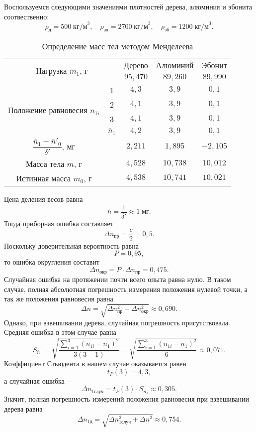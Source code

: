 Воспользуемся следующими значениями плотностей дерева, алюминия и эбонита соотвественно:
\[
\rho_\text{д}=500\;\text{кг/м}^3,\quad\rho_\text{ал}=2700\;\text{кг/м}^3,\quad\rho_\text{эб}=1200\;\text{кг/м}^3.
\]

\begin{table}[h]
	\begin{center}
	\begin{tabular}{|c|c|c|c|c|}
		\hline
		\multicolumn{2}{|c|}{\multirow{2}{*}{Нагрузка $m_1$, г}} & Дерево & Алюминий & Эбонит \\
		\cline{3-5}
		\multicolumn{2}{|c|}{} & $95{,}470$ & $89{,}260$ & $89{,}990$ \\
		\hline
		\hline
		\multirow{4}{*}{\parbox[c][4em]{9em}{Положение равновесия $n_{1i}$}} & 1 & $4{,}3$ & $3{,}9$ & $0{,}1$ \\
		\cline{2-5}
		& 2 & $4{,}1$ & $3{,}9$ & $0{,}1$ \\
		\cline{2-5}
		& 3 & $4{,}1$ & $3{,}9$ & $0{,}1$ \\
		\cline{2-5}
		& $\bar n_1$ & $4{,}2$ & $3{,}9$ & $0{,}1$ \\
		\hline
		\hline
		\parbox[c][4em]{6em}{$\dfrac{\bar n_1-\bar n'_0}{\delta'}$, мг} & & $2{,}211$ & $1{,}895$ & $-2{,}105$ \\
		\hline
		Масса тела $m$, г & & $4{,}528$ & $10{,}738$ & $10{,}012$ \\
		\hline
		Истинная масса $m_0$, г & & $4{,}538$ & $10{,}741$ & $10{,}021$ \\
		\hline
	\end{tabular}
	\caption{Определение масс тел методом Менделеева}\label{TbTwo}
	\end{center}
\end{table}

Цена деления весов равна
\[
h=\frac{1}{\delta'}\approx1\;\text{мг}. 
\]
Тогда приборная ошибка составляет
\[
\Delta n_\text{пр}=\frac{c}{2}=0{,}5.
\]
Поскольку доверительная вероятность равна
\[
P=0{,}95,
\]
то ошибка округления составит
\[
\Delta n_\text{окр}=P\cdot\Delta n_\text{пр}=0{,}475.
\]
Случайная ошибка на протяжении почти всего опыта равна нулю. В таком случае, полная абсолютная погрешность измерения положения нулевой точки, а так же положения равновесия равна
\[
\Delta n=\sqrt{\Delta n_\text{пр}^2+\Delta n_\text{окр}^2}\approx0{,}690.
\]
Однако, при взвешивании дерева, случайная погрешность присутствовала. Средняя ошибка в этом случае равна
\[
S_{\bar n_1}=\sqrt{\frac{\displaystyle\sum_{i=1}^3(n_{1i}-\bar n_1)^2}{3(3-1)}}=\sqrt{\frac{\displaystyle\sum_{i=1}^3(n_{1i}-\bar n_1)^2}{6}}\approx0{,}071.
\]
Коэффициент Стьюдента в нашем случае оказывается равен
\[
t_P(3)=4{,}3,
\]
а случайная ошибка ---
\[
\Delta n_{1\text{случ}}=t_P(3)\cdot S_{\bar n_1}\approx0{,}305.
\]
Значит, полная погрешность измерений положения равновесия при взвешивании дерева равна
\[
\Delta n_{1\text{д}}=\sqrt{\Delta n_{1\text{случ}}^2+\Delta n^2}\approx0{,}754.
\]


